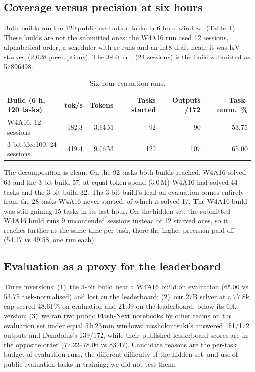 \documentclass[11pt]{article}
\begin{document}
\subsection{Coverage versus precision at six hours}\label{sec:six}
Both builds ran the 120 public evaluation tasks in 6-hour windows (Table~\ref{tab:six}). These builds are not the submitted ones: the W4A16 run used 12 sessions, alphabetical order, a scheduler with re-runs and an int8 draft head; it was KV-starved (2{,}028 preemptions). The 3-bit run (24 sessions) is the build submitted as 57896498.
\begin{table}[h]
\centering\small
\begin{tabular}{@{}lrrrrr@{}}
\toprule
Build (6 h, 120 tasks) & tok/s & Tokens & Tasks started & Outputs /172 & Task-norm.\ \% \\
\midrule
W4A16, 12 sessions & 182.3 & 3.94\,M & 92 & 90 & 53.75 \\
3-bit klee100, 24 sessions & 419.4 & 9.06\,M & 120 & 107 & 65.00 \\
\bottomrule
\end{tabular}
\caption{Six-hour evaluation runs.}
\label{tab:six}
\end{table}
The decomposition is clean. On the 92 tasks both builds reached, W4A16 solved 63 and the 3-bit build 57; at equal token spend (3.0\,M) W4A16 had solved 44 tasks and the 3-bit build 32. The 3-bit build's lead on evaluation comes entirely from the 28 tasks W4A16 never started, of which it solved 17. The W4A16 build was still gaining 15 tasks in its last hour.
On the hidden set, the submitted W4A16 build runs 9 uncontended sessions instead of 12 starved ones, so it reaches further at the same time per task; there the higher precision paid off (54.17 vs 49.58, one run each).

\subsection{Evaluation as a proxy for the leaderboard}
Three inversions: (1)~the 3-bit build beat a W4A16 build on evaluation (65.00 vs 53.75 task-normalised) and lost on the leaderboard; (2)~our 27B solver at a 77.8k cap scored 48.61\,\% on evaluation and 21.39 on the leaderboard, below its 60k version; (3)~we ran two public Flash-Next notebooks by other teams on the evaluation set under equal 5\,h\,23\,min windows: nisshokuitsuki's \cite{ni2026} answered 151/172 outputs and Domdolus's \cite{domdolus2026} 139/172, while their published leaderboard scores are in the opposite order (77.22--78.06 vs 83.47). Candidate reasons are the per-task budget of evaluation runs, the different difficulty of the hidden set, and use of public evaluation tasks in training; we did not test them.
\end{document}
